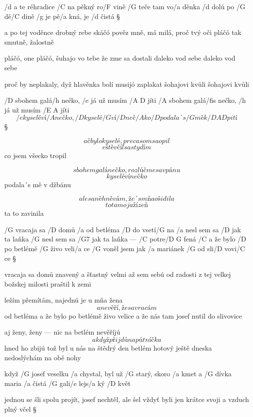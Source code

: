 
/d a te réhradice /C na pěkný ro/F vině
/G teče tam vo/a děnka /d dolů po /G dě/C dině
/g je pě/a kná, je /d čistá \S

a po tej voděnce drobný rebe skáčó
pověz mně, má milá, proč tvý oči pláčó
tak smutně, žalostně \s

pláčó, one pláčó, šuhajo vo tebe
že zme sa dostali daleko vod sebe
daleko vod sebe \s

proč by neplakaly, dyž hlavěnka bolí
musijó zaplakat šohajovi kvůli
šohajovi kvůli




/D sbohem galá/h nečko, /e já už musím /{A D} jíti
/A sbohem galá/fis nečko, /h já už musím /{E A} jíti
\[ /e kyselé ví/A nečko, /D kyselé /G ví/D neč/A ko
/D podala´s /G mě k /{D A D} pití \]\S

\[ ač bylo kyselé, preca som sa opil \]
\[ eště včíl sa stydím \]
co jsem všecko tropil \s

\[ sbohem galánečko, rozlúčme sa v pánu \]
\[ kyselé vínečko \]
podala´s mě v džbánu \s

\[ ale sa něhněvám, že´s mňa ošidila \]
\[ to ta moja žízeň \]
ta to zavinila




/G vracaja sa /D domů /a od betléma /D do vsetí/G na
/a nesl sem sa /D jak ta laňka
/G nesl sem sa /G7 jak ta laňka --- /C potre/{D G} fená
/C a že bylo /D po betlémě /G živo veli/a ce
/G voněl jsem jak /a mariánek /G od sli/D vovi/C ce \S

vracaja sa domů znavený a šťastný velmi
až sem sebú od radosti
z tej velkej božskej milosti
praštil k zemi \s

ležím přemítám, najednú je u mňa žena
\[ a nevěří, že sa vracám \] od betléma
a že bylo po betlémě živo velice
a že nás tam josef nutil do slivovice \s

aj ženy, ženy --- nic na betlém nevěříjú
\[ a když přijdú na pútníčka \] hned ho zbijú
tož byl u nás na štědrý den betlém hotový
ještě dneska nedoslýchám na obě nohy




když /G josef veselku /a chystal, byl už /G starý, skoro /a kmet
a /G dívka maria /a čistá /G gali/e lejs/a ký /D květ \s

jednou se šli spolu projít, josef nechtěl, ale šel
vždyť byli jen krátce svoji a vzduch plný včel \S

